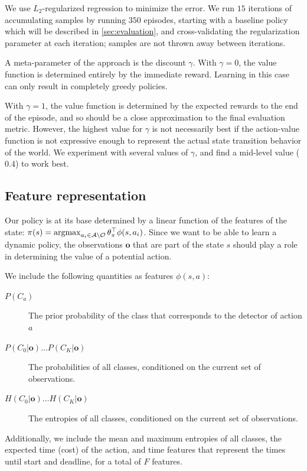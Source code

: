 We use $L_2$-regularized regression to minimize the error.
We run $15$ iterations of accumulating samples by running $350$ episodes, starting with a baseline policy which will be described in \autoref{sec:evaluation}, and cross-validating the regularization parameter at each iteration; samples are not thrown away between iterations.

A meta-parameter of the approach is the discount $\gamma$.
With $\gamma=0$, the value function is determined entirely by the immediate reward.
Learning in this case can only result in completely greedy policies.

With $\gamma=1$, the value function is determined by the expected rewards to the end of the episode, and so should be a close approximation to the final evaluation metric.
However, the highest value for $\gamma$ is not necessarily best if the action-value function is not expressive enough to represent the actual state transition behavior of the world.
We experiment with several values of $\gamma$, and find a mid-level value ($0.4$) to work best.

\subsection{Feature representation}
Our policy is at its base determined by a linear function of the features of the state: $\pi(s) = \argmax_{a_i \in \mathcal{A} \setminus \mathcal{O}} \theta_\pi^\top \phi(s,a_i)$.
Since we want to be able to learn a dynamic policy, the observations $\mathbf{o}$ that are part of the state $s$ should play a role in determining the value of a potential action.

We include the following quantities as features $\phi(s,a)$:
\begin{description}
\item[$P(C_a)$] The prior probability of the class that corresponds to the detector of action $a$
\item[$P(C_0|\mathbf{o}) \ldots P(C_K|\mathbf{o})$] The probabilities of all classes, conditioned on the current set of observations.
\item[$H(C_0|\mathbf{o}) \ldots H(C_K|\mathbf{o})$] The entropies of all classes, conditioned on the current set of observations.
\end{description}

Additionally, we include the mean and maximum entropies of all classes, the expected time (cost) of the action, and time features that represent the times until start and deadline, for a total of $F$ features.

